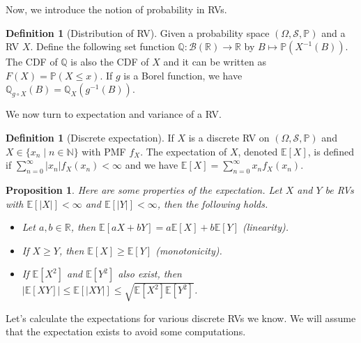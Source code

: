 \documentclass[paper=a4, fontsize=12pt]{scrartcl} %
\newtheorem{prop}[thm]{Proposition}
\theoremstyle{definition}
\newtheorem{defn}[thm]{Definition}
\theoremstyle{remark}
\newcommand{\R}{\mathbb{R}}
\newcommand{\N}{\mathbb{N}}
\newcommand{\Q}{\mathbb{Q}}
\newcommand{\E}{\mathbb{E}}
\newcommand{\borel}{\mathcal{B}(\R)}
\newcommand{\mS}{\mathcal{S}}
\renewcommand{\P}{\mathbb{P}}
\numberwithin{equation}{section} %
\numberwithin{figure}{section} %
\numberwithin{table}{section} %
\begin{document}
Now, we introduce the notion of probability in RVs.
\begin{defn}[Distribution of RV]
	Given a probability space $(\Omega, \mS, \P)$ and a RV $X$. Define the following set function $\Q : \borel \rightarrow \R$ by $B \mapsto \P(X^{-1}(B))$. The CDF of $\Q$ is also the CDF of $X$ and it can be written as $F(X) = \P(X \leq x)$. If $g$ is a Borel function, we have $\Q_{g \circ X}(B) = \Q_X(g^{-1}(B))$.
\end{defn}
We now turn to expectation and variance of a RV.
\begin{defn}[Discrete expectation]
	If $X$ is a discrete RV on $(\Omega, \mS, \P)$ and $X \in \{x_n \mid n \in \N\}$ with PMF $f_X$. The expectation of $X$, denoted $\E[X]$, is defined if $\sum_{n=0}^{\infty}|x_n|f_X(x_n) < \infty$ and we have $\E[X] = \sum_{n=0}^{\infty}x_nf_X(x_n)$.
\end{defn}
\begin{prop}
	Here are some properties of the expectation. Let $X$ and $Y$ be RVs with $\E[|X|] < \infty$ and $\E[|Y|] < \infty$, then the following holds.
	\begin{itemize}
		\item Let $a,b \in \R$, then $\E[aX + bY] = a\E[X] + b\E[Y]$ (linearity).
		\item If $X \geq Y$, then $\E[X] \geq \E[Y]$ (monotonicity).
		\item If $\E[X^2]$ and $\E[Y^2]$ also exist, then $|\E[XY]| \leq \E[|XY|] \leq \sqrt{\E[X^2]\E[Y^2]}$.
	\end{itemize}
\end{prop}
Let's calculate the expectations for various discrete RVs we know. We will assume that the expectation exists to avoid some computations.
\end{document}
